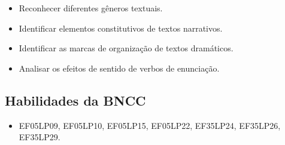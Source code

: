 \begin{itemize}
\item Reconhecer diferentes gêneros textuais.

\item Identificar elementos constitutivos de textos narrativos.

\item Identificar as marcas de organização de textos dramáticos.

\item Analisar os efeitos de sentido de verbos de enunciação.
\end{itemize}

\subsection{Habilidades da BNCC}

\begin{itemize}
\item EF05LP09, EF05LP10, EF05LP15, EF05LP22, EF35LP24, EF35LP26, EF35LP29.
\end{itemize}

